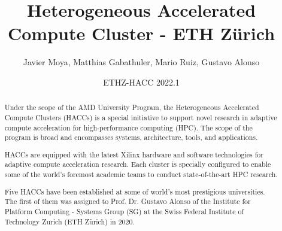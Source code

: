 \documentclass{article}
\title{Heterogeneous Accelerated Compute Cluster - ETH Zürich}
\author{Javier Moya, Matthias Gabathuler, Mario Ruiz, Gustavo Alonso}
\date{ETHZ-HACC 2022.1}
\begin{document}
\maketitle

\renewcommand{\abstractname}{Summary}
\begin{abstract}
Under the scope of the AMD University Program, the Heterogeneous Accelerated Compute Clusters (HACCs) is a special initiative to support novel research in adaptive compute acceleration for high-performance computing (HPC). The scope of the program is broad and encompasses systems, architecture, tools, and applications.

HACCs are equipped with the latest Xilinx hardware and software technologies for adaptive compute acceleration research. Each cluster is specially configured to enable some of the world’s foremost academic teams to conduct state-of-the-art HPC research.

Five HACCs have been established at some of world’s most prestigious universities. The first of them was assigned to Prof. Dr. Gustavo Alonso of the Institute for Platform Computing - Systems Group (SG) at the Swiss Federal Institute of Technology Zurich (ETH Zürich) in 2020.
\end{abstract}

\tableofcontents





%
%
\listoffigures
\end{document}
